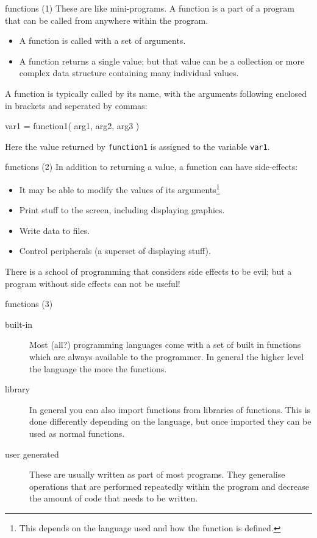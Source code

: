 \documentclass[pdf]{beamer}
\begin{document}
\begin{frame}[fragile]{functions (1)}
  These are like mini-programs. A function is a part of a program that can be
  called from anywhere within the program.
  \begin{itemize}
  \item A function is called with a set of arguments.
  \item A function returns a single value; but that value can be a collection
    or more complex data structure containing many individual values.
  \end{itemize}
  
  A function is typically called by its name, with the arguments following
  enclosed in brackets and seperated by commas:


  \begin{cppcode}
    var1 = function1( arg1, arg2, arg3 )
  \end{cppcode}

  Here the value returned by \texttt{function1} is assigned to the variable
  \texttt{var1}. 

\end{frame}

\begin{frame}[fragile]{functions (2)}
  In addition to returning a value, a function can have side-effects:

  \begin{itemize}
  \item It may be able to modify the values of its arguments\footnote{This
    depends on the language used and how the function is defined.}
  \item Print stuff to the screen, including displaying graphics.
  \item Write data to files.
  \item Control peripherals (a superset of displaying stuff).
  \end{itemize}
  
  There is a school of programming that considers side effects to be evil; but
  a program without side effects can not be useful!
\end{frame}

\begin{frame}[fragile]{functions (3)}
  \begin{description}
  \item[built-in] Most (all?) programming languages come with a set of built
    in functions which are always available to the programmer. In general the
    higher level the language the more the functions.
  \item[library] In general you can also import functions from libraries of
    functions. This is done differently depending on the language, but once
    imported they can be used as normal functions.
  \item[user generated] These are usually written as part of most
    programs. They generalise operations that are performed repeatedly within
    the program and decrease the amount of code that needs to be written.
  \end{description}
\end{frame}
\end{document}
